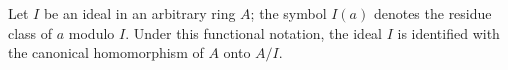 Let \(I\) be an ideal in an arbitrary ring \(A\); the symbol \(I(a)\) denotes the residue class of \(a\) modulo \(I\). Under this functional notation, the ideal \(I\) is identified with the canonical homomorphism of \(A\) onto \(A/I\).
